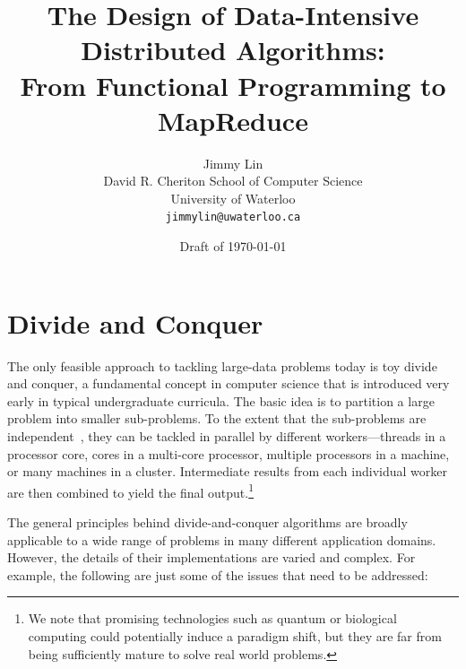 \documentclass[11pt]{article}
\begin{document}
\title{The Design of Data-Intensive Distributed Algorithms:\\
  From Functional Programming to MapReduce}

\author{Jimmy Lin\\[0.5ex]
David R. Cheriton School of Computer Science\\
University of Waterloo\\[0.5ex]
\texttt{jimmylin@uwaterloo.ca}}

\date{Draft of \today}

\maketitle

\tableofcontents

\section{Divide and Conquer}
\label{chapter2}

\noindent The only feasible approach to tackling large-data problems today is toy
divide and conquer, a fundamental concept in computer science that is
introduced very early in typical undergraduate curricula.  The basic
idea is to partition a large problem into smaller sub-problems.  To
the extent that the sub-problems are independent~\cite{Amdahl_1967},
they can be tackled in parallel by different workers---threads in a
processor core, cores in a multi-core processor, multiple processors
in a machine, or many machines in a cluster.  Intermediate results
from each individual worker are then combined to yield the final
output.\footnote{We note that promising technologies such as quantum
or biological computing could potentially induce a paradigm shift, but
they are far from being sufficiently mature to solve real world
problems.}

The general principles behind divide-and-conquer algorithms are
broadly applicable to a wide range of problems in many different
application domains.  However, the details of their implementations
are varied and complex.  For example, the following are just some of
the issues that need to be addressed:
\end{document}
